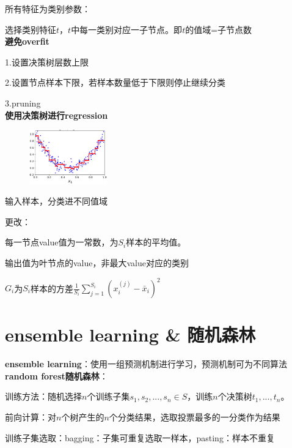 \documentclass[UTF8]{ctexart}
\begin{document}
  所有特征为类别参数：
  
  \quad 选择类别特征$t$，$t$中每一类别对应一子节点。即$t$的值域=子节点数\\
\textbf{避免overfit}

  1.设置决策树层数上限

  2.设置节点样本下限，若样本数量低于下限则停止继续分类
  
  3.pruning\\
\textbf{使用决策树进行regression}

  \begin{figure}[H] %
    \centering %
    \includegraphics[width=0.3\textwidth]{note_images/deci_tree_regression.png} %
  \end{figure}

  输入样本，分类进不同值域

  更改：
  
  \quad 每一节点value值为一常数，为$S_i$样本的平均值。
  
  \quad 输出值为叶节点的value，非最大value对应的类别

  \quad $G_i$为$S_i$样本的方差$\frac{1}{S_i}\sum_{j=1}^{S_i}(x_i^{(j)} - \bar{x}_i)^2$

\section{ensemble learning \& 随机森林}
\noindent \textbf{ensemble learning}：使用一组预测机制进行学习，预测机制可为不同算法\\
\textbf{random forest随机森林}：

  训练方法：随机选择$n$个训练子集$s_1, s_2, ..., s_n \in S$，训练$n$个决策树$t_1, ..., t_n$。
  
  前向计算：对$n$个树产生的$n$个分类结果，选取投票最多的一分类作为结果
  
  训练子集选取：bagging：子集可重复选取一样本，pasting：样本不重复
  
\end{document}
